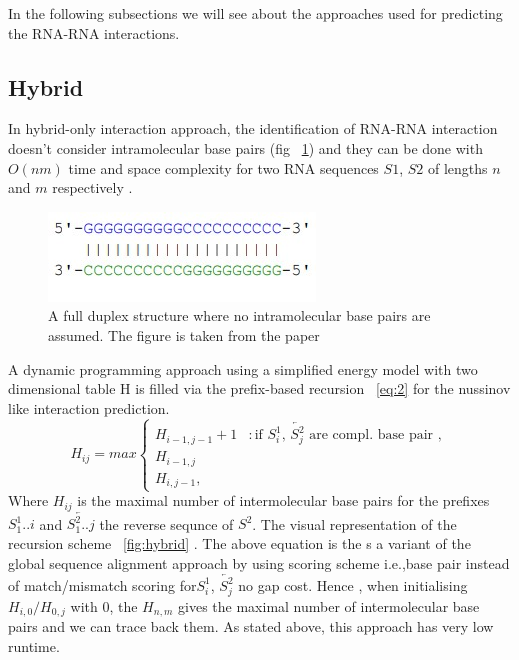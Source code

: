 \documentclass[twoside,a4paper]{report}
\begin{document}
	In the following subsections we will see about the approaches used for predicting the RNA-RNA interactions.\\

	
	\subsection{Hybrid}
	In hybrid-only interaction approach, the identification of RNA-RNA interaction doesn't consider intramolecular base pairs (fig ~\ref{fig:rnahybrid}) and they can be done with $O(nm)$ time and space complexity for two RNA sequences $S1$, $S2$ of lengths $n$ and $m$ respectively \citep{tjaden2006target}.\\
	
	\begin{figure}[H]
		\includegraphics[width=0.4\linewidth]{rnahybrid}
		\centering
		\caption{ A full duplex structure where no intramolecular base pairs are assumed. The figure is taken from the paper \citep{wright2018structure}} 
		\label{fig:rnahybrid}
	\end{figure}
	
	
	 A dynamic programming approach using a simplified energy model with two dimensional table H is filled via the prefix-based recursion ~\ref{eq:2} for the nussinov like interaction prediction.\\
	 \begin{equation}
	 \label{eq:2}
	H_{ij} = max \begin{cases}
	H_{i-1,j-1}+1 & : \text{if $S^1_i$, $\overleftarrow{S^2_j}$ are compl. base pair }, \\
	H_{i-1,j} \\
	H_{i,j-1} ,
	\end{cases}
	\end{equation}
	Where $H_{ij}$ is the maximal number of intermolecular base pairs for the prefixes $S^1_1..i$	and $\overleftarrow{S^2_1..j}$ the reverse sequnce of $S^2$. The visual representation of the recursion scheme ~\ref{fig:hybrid} . The above equation is the s a variant of the global sequence alignment approach by \citep{needleman1970general} using scoring scheme i.e.,base pair instead of match/mismatch scoring for$S^1_i$, $\overleftarrow{S^2_j}$ no gap cost. Hence , when initialising $ H_{i,0} / H_{0,j} $ with 0, the $H_{n,m} $ gives the maximal number of intermolecular base pairs and we can trace back them. As stated above, this approach has very low runtime.\\
	
\end{document}
